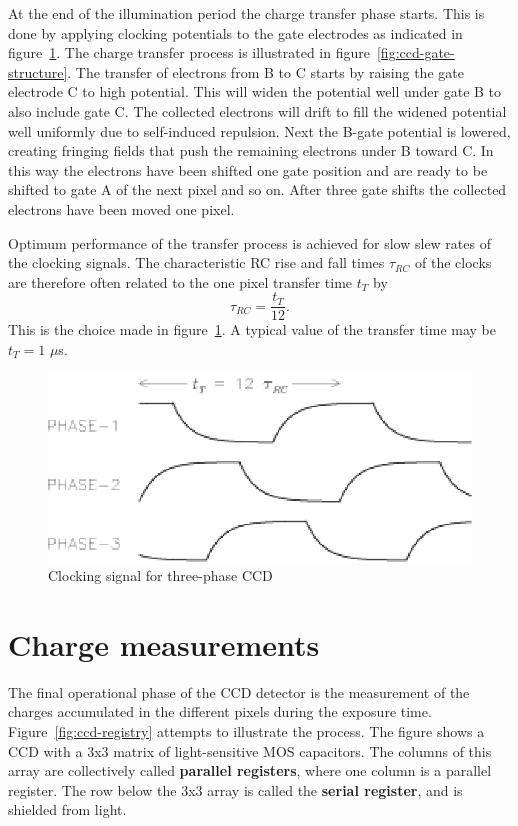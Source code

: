 At the end of the illumination period the charge transfer phase
starts. This is done by applying clocking potentials to the gate
electrodes as indicated in figure~\ref{CCD.figclocking}. The charge transfer process is illustrated in figure~\ref{fig:ccd-gate-structure}. The transfer
of electrons from B to C starts by raising the gate electrode C to
high potential. This will widen the potential well under gate B to
also include gate C. The collected electrons will drift to fill the
widened potential well uniformly due to self-induced repulsion. Next
the B-gate potential is lowered, creating fringing fields that push
the remaining electrons under B toward C. In this way the electrons
have been shifted one gate position and are ready to be shifted to
gate A of the next pixel and so on. After three gate shifts the
collected electrons have been moved one pixel.

Optimum performance of the transfer process is achieved for slow slew
rates of the clocking signals. The characteristic RC rise and fall times
 $\tau_{RC}$ of the clocks are therefore often related to the one pixel
transfer time $t_T$ by
\begin{equation}
  \tau_{RC} = \frac{t_T}{12}.
\end{equation}
This is the choice made in figure~\ref{CCD.figclocking}. A typical
value of the transfer time may be $t_T = 1$ $\mu$s.

\begin{figure}[h]
  \centering
	\includegraphics{CCD_clocking.eps}
  \caption{Clocking signal for three-phase CCD}
  \label{CCD.figclocking}
\end{figure}


\section{Charge measurements} 



The final operational phase of the CCD detector is the measurement of
the charges accumulated in the different pixels during the exposure
time. Figure~\ref{fig:ccd-registry} attempts to illustrate the process. The
figure shows a CCD with a 3x3 matrix of light-sensitive MOS capacitors. The
columns of this array are collectively called \textbf{parallel registers}, where
one column is a parallel register. The row below the 3x3 array is called the
\textbf{serial register}, and is shielded from light.

